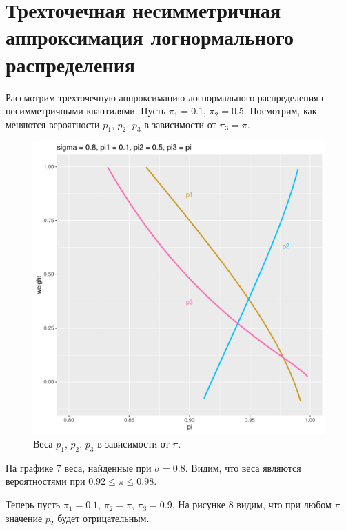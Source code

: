 \documentclass[12pt]{article}
\begin{document}
\section{Трехточечная несимметричная аппроксимация логнормального распределения}

Рассмотрим трехточечную аппроксимацию логнормального распределения с несимметричными квантилями. Пусть $\pi_{1} = 0.1$, $\pi_{2} = 0.5$. Посмотрим, как меняются вероятности $p_{1}$, $p_{2}$, $p_{3}$ в зависимости от $\pi_{3} = \pi$. 
\begin{figure}[!hhh]
	\begin{center}
		\begin{minipage}[h]{0.95\linewidth}
			\includegraphics[width=1\linewidth]{img/p123_1.pdf}
			\caption{Веса $p_{1}$, $p_{2}$, $p_{3}$ в зависимости от $\pi$. } %
			\label{ris10} %
		\end{minipage}
	\end{center}
\end{figure}
На графике 7 веса, найденные при $\sigma = 0.8$. Видим, что веса являются вероятностями при  $0.92 \leq \pi \leq 0.98$.

Теперь пусть $\pi_{1} = 0.1$, $\pi_{2} = \pi$, $\pi_{3} = 0.9$. На рисунке 8 видим, что при любом $\pi$ значение $p_{2}$ будет отрицательным.
\end{document}
